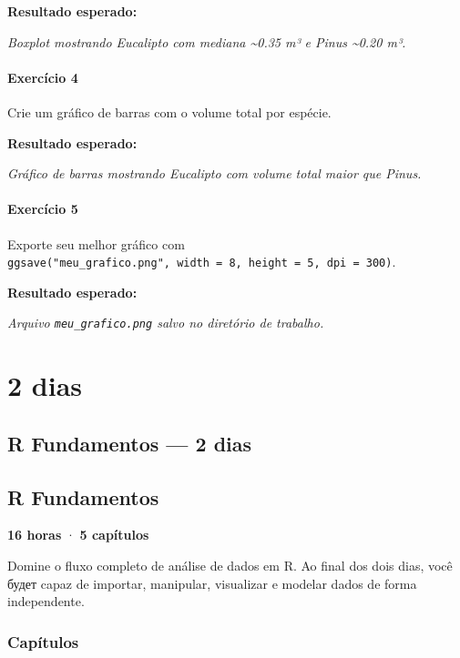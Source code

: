 \documentclass[
  letterpaper,
]{scrbook}
\begin{document}
\textbf{Resultado esperado:}

\emph{Boxplot mostrando Eucalipto com mediana \textasciitilde0.35 m³ e
Pinus \textasciitilde0.20 m³.}

\subsection{Exercício 4}\label{exercuxedcio-4}

Crie um gráfico de barras com o volume total por espécie.

\textbf{Resultado esperado:}

\emph{Gráfico de barras mostrando Eucalipto com volume total maior que
Pinus.}

\subsection{Exercício 5}\label{exercuxedcio-5}

Exporte seu melhor gráfico com
\texttt{ggsave("meu\_grafico.png",\ width\ =\ 8,\ height\ =\ 5,\ dpi\ =\ 300)}.

\textbf{Resultado esperado:}

\emph{Arquivo \texttt{meu\_grafico.png} salvo no diretório de trabalho.}

\part{2 dias}

\chapter{R Fundamentos --- 2 dias}\label{r-fundamentos-2-dias}

\chapter*{R Fundamentos}\label{r-fundamentos}


\textbf{16 horas} · \textbf{5 capítulos}

Domine o fluxo completo de análise de dados em R. Ao final dos dois
dias, você будет capaz de importar, manipular, visualizar e modelar
dados de forma independente.

\section{Capítulos}\label{capuxedtulos-1}
\end{document}
